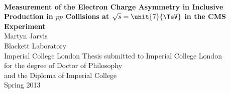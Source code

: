 \begin{titlepage}
\begin{center}
\vspace{5cm}
~
\\[2cm]
\Large{\textbf{Measurement of the Electron Charge Asymmetry in Inclusive \PW
Production in $pp$ Collisions at $\sqrt{s} = \unit{7}{\TeV}$ in the CMS
Experiment}}
\\[2cm]
\large{Martyn Jarvis}
\\[1cm]
\large{Blackett Laboratory\\Imperial College London}
\vfill
\normalsize{Thesis submitted to Imperial College London\\
       for the degree of Doctor of Philosophy\\
       and the Diploma of Imperial College}
\\[1cm]
\normalsize{Spring 2013}

\end{center}
\end{titlepage}

\cleardoublepage

